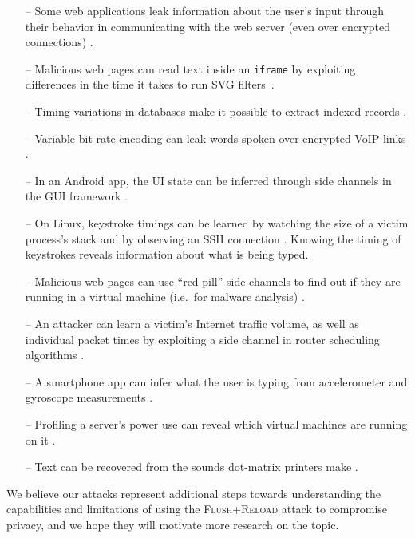 \documentclass[letterpaper,twocolumn,10pt]{article}
\begin{document}
\begin{itemize}
    \item[--] Some web applications leak information about the user's input through
          their behavior in communicating with the web server (even over
          encrypted connections) \cite{bortz2007exposing, chen2010side}.
      \item[--] Malicious web pages can read text inside an \texttt{iframe} by
          exploiting differences in the time it takes to run SVG
          filters~\cite{pixelperfect}. 
    \item[--] Timing variations in databases make it possible to extract
          indexed records \cite{futoransky2007nd2db}.
    \item[--] Variable bit rate encoding can leak words spoken over encrypted
        VoIP links \cite{white2011phonotactic}.
    \item[--] In an Android app, the UI state can be inferred through side channels
          in the GUI framework \cite{chen2014peeking}.
    \item[--] On Linux, keystroke timings can be learned by watching the size of
          a victim process's stack \cite{zhang2009peeping} and by observing an
          SSH connection \cite{song2001timing}. Knowing the timing of keystrokes
          reveals information about what is being typed.
    \item[--] Malicious web pages can use ``red pill'' side channels to find out if
          they are running in a virtual machine (i.e.\ for malware analysis)
          \cite{ho2014tick}.
    \item[--] An attacker can learn a victim's Internet traffic volume, as well as
          individual packet times by exploiting a side channel in router
          scheduling algorithms \cite{kadloor2010low}.
    \item[--] A smartphone app can infer what the user is typing from accelerometer
          and gyroscope measurements \cite{owusu2012accessory,
          cai2012practicality}.
    \item[--] Profiling a server's power use can reveal which virtual machines
        are running on it \cite{hlavacs2011energy}.
    \item[--] Text can be recovered from the sounds dot-matrix printers make
          \cite{backes2010acoustic}.
\end{itemize}

We believe our attacks represent additional steps towards understanding the
capabilities and limitations of using the \textsc{Flush+Reload} attack to
compromise privacy, and we hope they will motivate more research on the topic.
\end{document}

